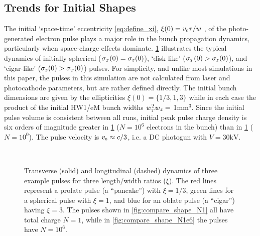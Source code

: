 \subsection{Trends for Initial Shapes} \label{sec:initial_shapes}

The initial `space-time' eccentricity \ref{eq:define_xi}, $\xi ( 0 ) = v_{{\scriptscriptstyle 0}} \tau / w $ , of the photo-generated electron pulse plays a major role in the bunch propagation dynamics, particularly when space-charge effects dominate.
\ref{fig:compare_shape} illustrates the typical dynamics of initially spherical ($ \sigma_{ {\scriptscriptstyle T} }(0) = \sigma_{z} ( 0 ) $), `disk-like' ($ \sigma_{ {\scriptscriptstyle T} } ( 0 ) > \sigma_{ z } ( 0 ) $), and `cigar-like' ($ \sigma_{ z } ( 0 ) > \sigma_{ {\scriptscriptstyle T} } ( 0 ) $) pulses.
For simplicity, and unlike most simulations in this paper, the pulses in this simulation are not calculated from laser and photocathode parameters, but are rather defined directly.
The initial bunch dimensions are given by the ellipticities $ \xi(0) = \{ 1/3 , 1 , 3 \} $ while in each case the product of the initial HW1/eM bunch widths $w_{{\scriptscriptstyle T}}^2 w_z = $ 1mm$^3$.
Since the initial pulse volume is consistent between all runs, initial peak pulse charge density is six orders of magnitude greater in \ref{fig:compare_shape} ($ N = 10^{6} $ electrons in the bunch) than in \ref{fig:compare_shape} ($ N = 10^{0} $).
The pulse velocity is $ v_{{\scriptscriptstyle 0}} \approx c/3 $, i.e. a DC photogun with $V = 30\text{kV} $.

\begin{figure}
  \centering
  \subfloat[][]{
    \label{fig:compare_shape_N1}
    
  }
  \\
  \subfloat[][]{
    \label{fig:compare_shape_N1e6}
    
  }
  \caption[AG simulation of free-space pulse expansion]{
    Transverse (solid) and longitudinal (dashed) dynamics of three example pulses for three length/width ratios ($\xi$). 
    The red lines represent a prolate pulse (a ``pancake'') with $\xi=1/3$, green lines for a spherical pulse with $\xi=1$, and blue for an oblate pulse (a ``cigar'') having $\xi=3$.
    The pulses shown in \ref{fig:compare_shape_N1} all have total charge $N=1$, while in \ref{fig:compare_shape_N1e6} the pulses have $N=10^6$.
  }
  \label{fig:compare_shape}
\end{figure}

